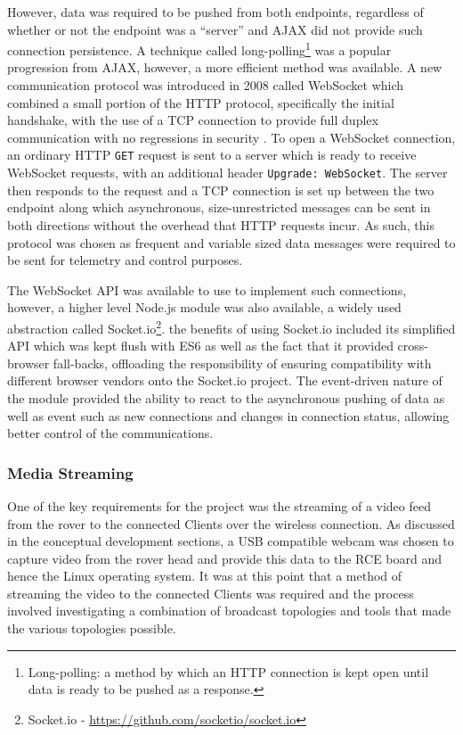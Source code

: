       However, data was required to be pushed from both endpoints, regardless of whether or not the endpoint was a ``server'' and AJAX did not provide such connection persistence. A technique called long-polling\footnote{Long-polling: a method by which an HTTP connection is kept open until data is ready to be pushed as a response.} was a popular progression from AJAX, however, a more efficient method was available. A new communication protocol was introduced in 2008 called WebSocket which combined a small portion of the HTTP protocol, specifically the initial handshake, with the use of a TCP connection to provide full duplex communication with no regressions in security \cite{websocket_2016}. To open a WebSocket connection, an ordinary HTTP \texttt{GET} request is sent to a server which is ready to receive WebSocket requests, with an additional header \texttt{Upgrade: WebSocket}. The server then responds to the request and a TCP connection is set up between the two endpoint along which asynchronous, size-unrestricted messages can be sent in both directions without the overhead that HTTP requests incur. As such, this protocol was chosen as frequent and variable sized data messages were required to be sent for telemetry and control purposes.
      
      The WebSocket API was available to use to implement such connections, however, a higher level Node.js module was also available, a widely used abstraction called Socket.io\footnote{Socket.io - \url{https://github.com/socketio/socket.io}}. the benefits of using Socket.io included its simplified API which was kept flush with ES6 as well as the fact that it provided cross-browser fall-backs, offloading the responsibility of ensuring compatibility with different browser vendors onto the Socket.io project. The event-driven nature of the module provided the ability to react to the asynchronous pushing of data as well as event such as new connections and changes in connection status, allowing better control of the communications.
      
      
    \subsubsection{Media Streaming}
      One of the key requirements for the project was the streaming of a video feed from the rover to the connected Clients over the wireless connection. As discussed in the conceptual development sections, a USB compatible webcam was chosen to capture video from the rover head and provide this data to the RCE board and hence the Linux operating system. It was at this point that a method of streaming the video to the connected Clients was required and the process involved investigating a combination of broadcast topologies and tools that made the various topologies possible.
      
